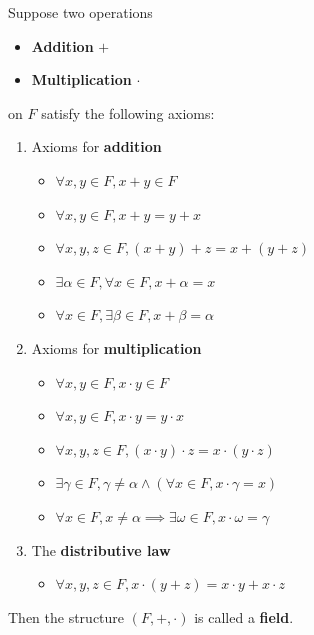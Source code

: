 \begin{definition} \label{an1:def:field}
  Suppose two operations
  \begin{itemize}
    \item \textbf{Addition} $+$
    \item \textbf{Multiplication} $\cdot$
  \end{itemize}
  on $F$ satisfy the following axioms:
  \begin{enumerate}[label=\textbf{(\Alph*)}]
    \item Axioms for \textbf{addition}
          \begin{itemize}
            \item $\forall x, y \in F, x + y \in F$
            \item $\forall x, y \in F, x + y = y + x$
            \item $\forall x, y, z \in F, (x + y) + z = x + (y + z)$
            \item $\exists \alpha \in F, \forall x \in F, x + \alpha = x$
            \item $\forall x \in F, \exists \beta \in F, x + \beta = \alpha$
          \end{itemize}
    \item Axioms for \textbf{multiplication}
          \begin{itemize}
            \item $\forall x, y \in F, x \cdot y \in F$
            \item $\forall x, y \in F, x \cdot y = y \cdot x$
            \item $\forall x, y, z \in F, (x \cdot y) \cdot z = x \cdot (y \cdot z)$
            \item $\exists \gamma \in F, \gamma \neq \alpha \land (\forall x \in F, x \cdot \gamma = x)$
            \item $\forall x \in F, x \neq \alpha \implies \exists \omega \in F, x \cdot \omega = \gamma$
          \end{itemize}
    \item The \textbf{distributive law}
          \begin{itemize}
            \item $\forall x, y, z \in F, x \cdot (y + z) = x \cdot y + x \cdot z$
          \end{itemize}
  \end{enumerate}
  Then the structure $(F, +, \cdot)$ is called a \textbf{field}.
\end{definition}

